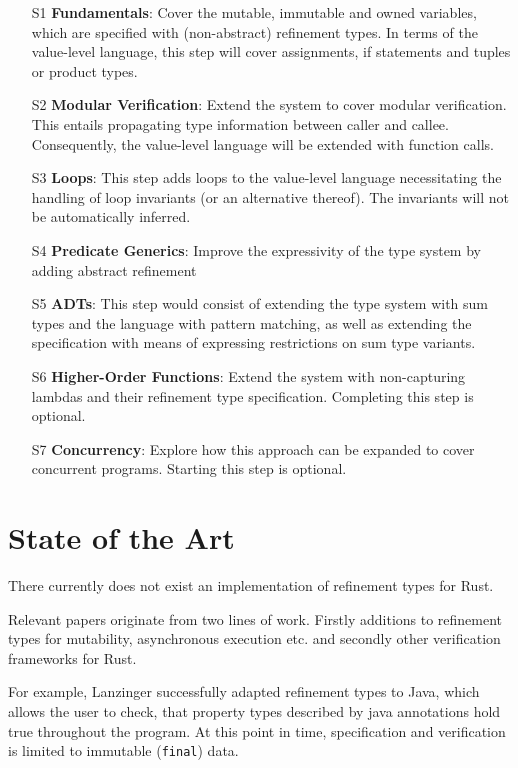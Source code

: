 \documentclass[11pt]{article}
\newcommand{\code}[1]{\texttt{#1}}
\begin{document}
\begin{itemize}
	\item[S1] \textbf{Fundamentals}: Cover the mutable, immutable and owned variables, which are specified with (non-abstract) refinement types. In terms of the value-level language, this step will cover assignments, if statements and tuples or product types.
	\item[S2] \textbf{Modular Verification}: Extend the system to cover modular verification. This entails propagating type information between caller and callee. Consequently, the value-level language will be extended with function calls.
	\item[S3] \textbf{Loops}: This step adds loops to the value-level language necessitating the handling of loop invariants (or an  alternative thereof). The invariants will not be automatically inferred.
	\item[S4] \textbf{Predicate Generics}: Improve the expressivity of the type system by adding abstract refinement
	\item[S5] \textbf{ADTs}: This step would consist of extending the type system with sum types and the language with pattern matching, as well as extending the specification with means of expressing restrictions on sum type variants.
	\item[S6] \textbf{Higher-Order Functions}: Extend the system with non-capturing lambdas and their refinement type specification. Completing this step is optional.
	\item[S7] \textbf{Concurrency}: Explore how this approach can be expanded to cover concurrent programs. Starting this step is optional.
\end{itemize}

\section{State of the Art}

There currently does not exist an implementation of refinement types for Rust.

Relevant papers originate from two lines of work. Firstly additions to refinement types for mutability, asynchronous execution etc. and secondly other verification frameworks for Rust.

For example, Lanzinger \cite{lanzinger_property_2021} successfully adapted refinement types to Java, which allows the user to check, that property types described by java annotations hold true throughout the program. At this point in time, specification and verification is limited to immutable (\code{final}) data.
\end{document}
